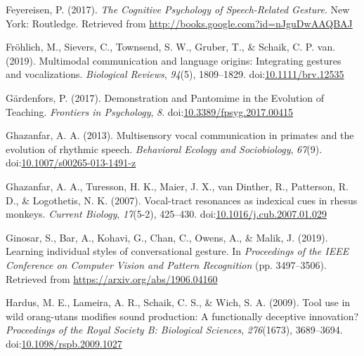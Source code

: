 \documentclass[
  man,floatsintext]{apa6}
\newlength{\cslhangindent}
\newenvironment{cslreferences}%
  {\setlength{\parindent}{0pt}%
  \everypar{\setlength{\hangindent}{\cslhangindent}}\ignorespaces}%
  {\par}
\begin{document}
\begin{cslreferences}
\leavevmode\hypertarget{ref-feyereisenCognitivePsychologySpeechRelated2017}{}%
Feyereisen, P. (2017). \emph{The Cognitive Psychology of Speech-Related Gesture}. New York: Routledge. Retrieved from \url{http://books.google.com?id=nJguDwAAQBAJ}

\leavevmode\hypertarget{ref-frohlichMultimodalCommunicationLanguage2019}{}%
Fröhlich, M., Sievers, C., Townsend, S. W., Gruber, T., \& Schaik, C. P. van. (2019). Multimodal communication and language origins: Integrating gestures and vocalizations. \emph{Biological Reviews}, \emph{94}(5), 1809--1829. doi:\href{https://doi.org/10.1111/brv.12535}{10.1111/brv.12535}

\leavevmode\hypertarget{ref-gardenforsDemonstrationPantomimeEvolution2017}{}%
Gärdenfors, P. (2017). Demonstration and Pantomime in the Evolution of Teaching. \emph{Frontiers in Psychology}, \emph{8}. doi:\href{https://doi.org/10.3389/fpsyg.2017.00415}{10.3389/fpsyg.2017.00415}

\leavevmode\hypertarget{ref-ghazanfarMultisensoryVocalCommunication2013}{}%
Ghazanfar, A. A. (2013). Multisensory vocal communication in primates and the evolution of rhythmic speech. \emph{Behavioral Ecology and Sociobiology}, \emph{67}(9). doi:\href{https://doi.org/10.1007/s00265-013-1491-z}{10.1007/s00265-013-1491-z}

\leavevmode\hypertarget{ref-ghazanfarVocaltractResonancesIndexical2007}{}%
Ghazanfar, A. A., Turesson, H. K., Maier, J. X., van Dinther, R., Patterson, R. D., \& Logothetis, N. K. (2007). Vocal-tract resonances as indexical cues in rhesus monkeys. \emph{Current Biology}, \emph{17}(5-2), 425--430. doi:\href{https://doi.org/10.1016/j.cub.2007.01.029}{10.1016/j.cub.2007.01.029}

\leavevmode\hypertarget{ref-ginosarLearningIndividualStyles2019}{}%
Ginosar, S., Bar, A., Kohavi, G., Chan, C., Owens, A., \& Malik, J. (2019). Learning individual styles of conversational gesture. In \emph{Proceedings of the IEEE Conference on Computer Vision and Pattern Recognition} (pp. 3497--3506). Retrieved from \url{https://arxiv.org/abs/1906.04160}

\leavevmode\hypertarget{ref-hardusToolUseWild2009}{}%
Hardus, M. E., Lameira, A. R., Schaik, C. S., \& Wich, S. A. (2009). Tool use in wild orang-utans modifies sound production: A functionally deceptive innovation? \emph{Proceedings of the Royal Society B: Biological Sciences}, \emph{276}(1673), 3689--3694. doi:\href{https://doi.org/10.1098/rspb.2009.1027}{10.1098/rspb.2009.1027}


\end{cslreferences}
\end{document}
